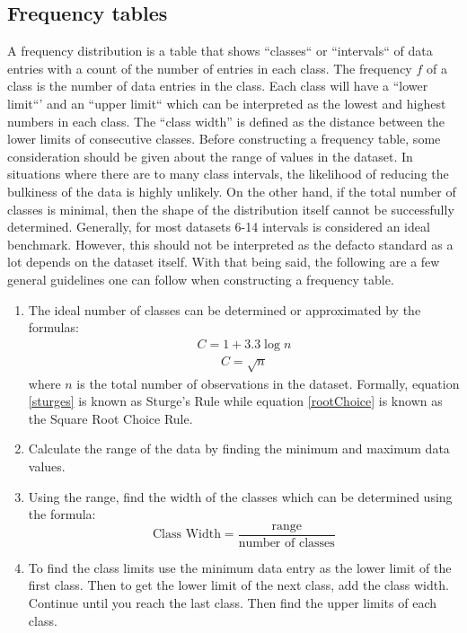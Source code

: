 \subsection{Frequency tables}
A frequency distribution is a table that shows ``classes`` or ``intervals`` of data 
entries with a count of the number of entries in each class. The frequency $f$ of 
a class is the number of data entries in the class. Each class will have a 
``lower limit``' and an ``upper limit`` which can be interpreted as the 
lowest and highest numbers in each class. The “class width” is defined as the 
distance between the lower limits of consecutive classes. Before constructing a 
frequency table, some consideration should be given about the range of values in 
the dataset. In situations where there are to many class intervals, the likelihood 
of reducing the bulkiness of the data is highly unlikely. On the other hand, if 
the total number of classes is minimal, then the shape of the distribution itself 
cannot be successfully determined. Generally, for most datasets 6-14 intervals 
is considered an ideal benchmark. However, this should not be interpreted as the 
defacto standard as a lot depends on the dataset itself. With that being said, 
the following are a few general guidelines one can follow when constructing a 
frequency table. 

\begin{enumerate}
    \item The ideal number of classes can be determined or approximated by the 
    formulas: 
    \begin{align}
        C = 1 + 3.3\log{n} \label{sturges}
    \end{align}
    \begin{align}
        C = \sqrt{n} \label{rootChoice}
    \end{align}
    where $n$ is the total number of observations in the dataset. Formally, 
    equation \ref{sturges} is known as Sturge's Rule while equation \ref{rootChoice}
    is known as the Square Root Choice Rule. 
    \item Calculate the range of the data by finding the minimum and maximum data 
    values. 
    \item  Using the range, find the width of the classes which can be determined
    using the formula:
    \begin{equation}
        \mbox{Class Width} = \frac{\mbox{range}}{\mbox{number of classes}}
    \end{equation}
    \item To find the class limits use the minimum data entry as the lower limit 
    of the first class. Then to get the lower limit of the next class, add the 
    class width. Continue until you reach the last class. Then find the upper 
    limits of each class.
\end{enumerate}

